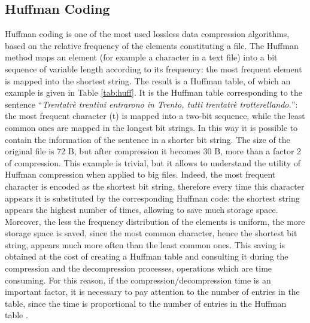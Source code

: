 \subsection{Huffman Coding}
\label{sec:huff}
Huffman coding is one of the most used lossless data compression algorithms, based on the relative frequency of the elements constituting a file. The Huffman method maps an element (for example a character in a text file) into a bit sequence of variable length according to its frequency: the most frequent element is mapped into the shortest string. The result is a Huffman table, of which an example is given in Table \ref{tab:huff}. It is the Huffman table corresponding to the sentence ``\textit{Trentatrè trentini entrarono in Trento, tutti trentatrè trotterellando.}'': the most frequent character (t) is mapped into a two-bit sequence, while the least common ones are mapped in the longest bit strings. In this way it is possible to contain the information of the sentence in a shorter bit string. The size of the original file is 72 B, but after compression it becomes 30 B, more than a factor 2 of compression. This example is trivial, but it allows to understand the utility of Huffman compression when applied to big files. Indeed, the most frequent character is encoded as the shortest bit string, therefore every time this character appears it is substituted by the corresponding Huffman code: the shortest string appears the highest number of times, allowing to save much storage space. Moreover, the less the frequency distribution of the elements is uniform, the more storage space is saved, since the most common character, hence the shortest bit string, appears much more often than the least common ones. This saving is obtained at the cost of creating a Huffman table and consulting it during the compression and the decompression processes, operations which are time consuming. For this reason, if the compression/decompression time is an important factor, it is necessary to pay attention to the number of entries in the table, since the time is proportional to the number of entries in the Huffman table \cite{huffman}.
%

